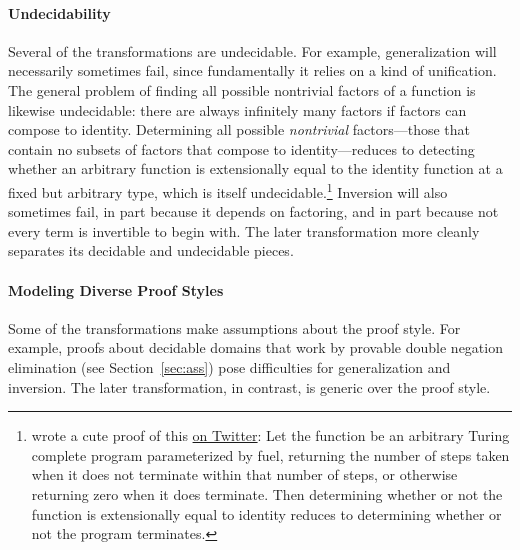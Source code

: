 \paragraph{Undecidability}
Several of the transformations are undecidable.
For example, generalization will necessarily sometimes fail, since fundamentally it relies on a kind of unification.
The general problem of finding all possible nontrivial factors of a function is likewise undecidable:
there are always infinitely many factors if factors can compose to identity.
Determining all possible \textit{nontrivial} factors---those that contain no subsets of factors
that compose to identity---reduces to detecting whether an arbitrary function is extensionally equal
to the identity function at a fixed but arbitrary type,
which is itself undecidable.\footnote{ wrote a cute proof of this \href{https://twitter.com/ezyang/status/1391546552989241346}{on Twitter}: Let the function be an arbitrary Turing complete program parameterized by fuel, returning
the number of steps taken when it does not terminate within that number of steps, or otherwise returning zero when it does terminate.
Then determining whether or not the function is extensionally equal to identity reduces to determining whether or not
the program terminates.}
Inversion will also sometimes fail, in part because it depends on factoring,
and in part because not every term is invertible to begin with.
The later \toolnamec transformation more cleanly separates its decidable and undecidable pieces.

\paragraph{Modeling Diverse Proof Styles}
Some of the transformations make assumptions about the proof style.
For example, proofs about decidable domains that work by provable double negation elimination
(see Section~\ref{sec:ass}) pose difficulties for generalization and inversion.
The later \toolnamec transformation, in contrast, is generic over the
proof style.

